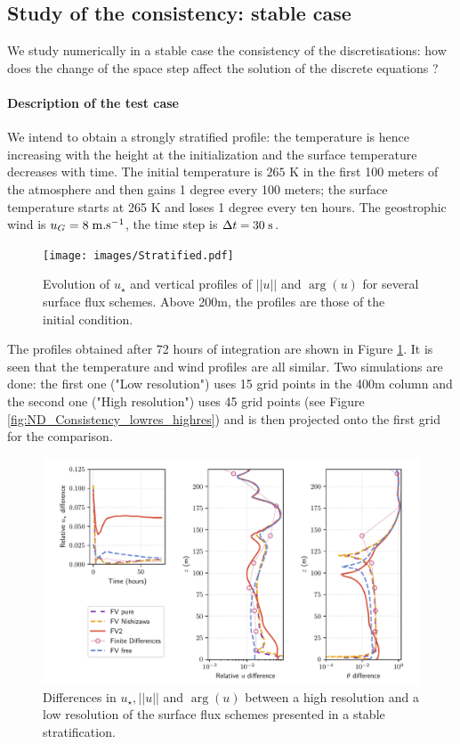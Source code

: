 \subsection{Study of the consistency: stable case}
We study numerically in a stable case the consistency of the
discretisations: how does the change of the space step affect the
solution of the discrete equations ?
\paragraph{Description of the test case}
We intend to obtain a strongly stratified profile: the temperature
is hence increasing with the height at the initialization and
the surface temperature decreases with time.
The initial temperature is $265$ K in the first 100 meters of the
atmosphere and then gains 1 degree every 100 meters;
the surface temperature starts at 265 K and loses
1 degree every ten hours.
The geostrophic wind is $u_G = 8 \;{\rm m}.{\rm s}^{-1}$,
the time step is $\Delta t = 30 \;{\rm s}$.
\begin{figure}
	\centering
\texttt{[image: images/Stratified.pdf]}
	\caption{ Evolution of $u_\star$ and
		vertical profiles of $||u||$ and $\arg(u)$ for
		several surface flux schemes. Above 200m,
		the profiles are those of the initial condition.
	}
	\label{fig:ND_Consistency_Stratified}
\end{figure}
The profiles obtained after 72 hours of integration are
shown in Figure \ref{fig:ND_Consistency_Stratified}.
It is seen that the temperature and wind profiles are
all similar.
Two simulations are done: the first one ("Low resolution")
uses 15 grid points
in the 400m column and the second one ("High resolution")
uses 45 grid points (see Figure \ref{fig:ND_Consistency_lowres_highres})
and is then projected onto the first grid for the comparison.
\begin{figure}
	\centering
\includegraphics[scale=0.6]{images/consistency_comparisonStratified.pdf}
	\caption{Differences in $u_\star, ||u||$ and $\arg(u)$
	between a high resolution and a low resolution
	of the surface flux schemes presented in a stable
	stratification.
	}
	\label{fig:ND_Consistency_comparisonStratified}
\end{figure}
